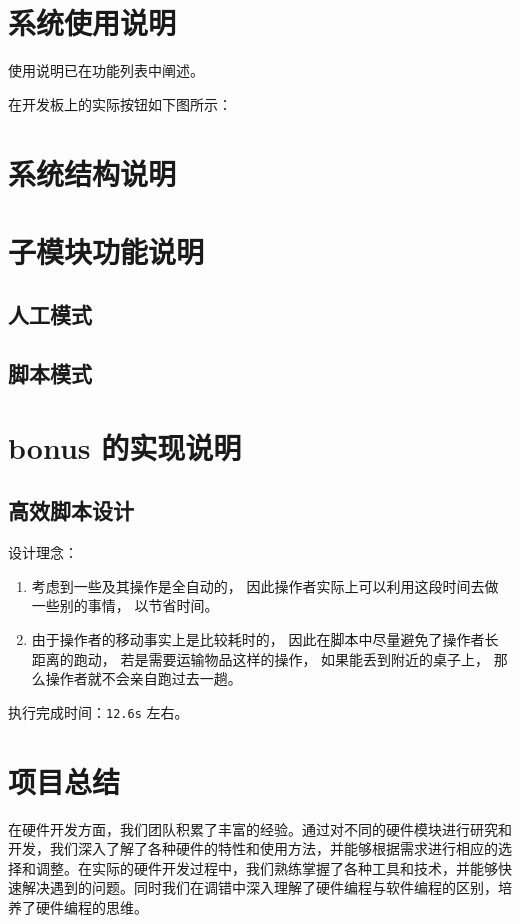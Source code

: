 \documentclass[12pt, a4paper]{ctexart}
\begin{document}
\section{系统使用说明}

使用说明已在功能列表中阐述。

在开发板上的实际按钮如下图所示：

\section{系统结构说明}

\section{子模块功能说明}
\subsection{人工模式}

\subsection{脚本模式}

\section{bonus 的实现说明}

\subsection{高效脚本设计}
设计理念：
\begin{enumerate}
\item 考虑到一些及其操作是全自动的，
因此操作者实际上可以利用这段时间去做一些别的事情，
以节省时间。
\item 由于操作者的移动事实上是比较耗时的，
因此在脚本中尽量避免了操作者长距离的跑动，
若是需要运输物品这样的操作，
如果能丢到附近的桌子上，
那么操作者就不会亲自跑过去一趟。
\end{enumerate}

执行完成时间：\texttt{12.6s} 左右。
\section{项目总结}

在硬件开发方面，我们团队积累了丰富的经验。通过对不同的硬件模块进行研究和开发，我们深入了解了各种硬件的特性和使用方法，并能够根据需求进行相应的选择和调整。在实际的硬件开发过程中，我们熟练掌握了各种工具和技术，并能够快速解决遇到的问题。同时我们在调错中深入理解了硬件编程与软件编程的区别，培养了硬件编程的思维。
\end{document}
